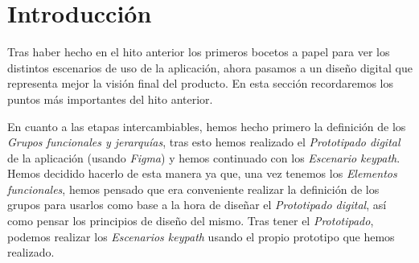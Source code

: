 \section{Introducción}

Tras haber hecho en el hito anterior los primeros bocetos a papel para ver los
distintos escenarios de uso de la aplicación, ahora pasamos a un diseño digital que
representa mejor la visión final del producto. En esta sección recordaremos los puntos
más importantes del hito anterior.

En cuanto a las etapas intercambiables, hemos hecho primero la definición de los \textit{Grupos
funcionales y jerarquías}, tras esto hemos realizado el \textit{Prototipado digital} de la aplicación
(usando \textit{Figma}) y hemos continuado con los \textit{Escenario keypath}. Hemos decidido hacerlo
de esta manera ya que, una vez tenemos los \textit{Elementos funcionales}, hemos pensado que era conveniente
realizar la definición de los grupos para usarlos como base a la hora de diseñar el \textit{Prototipado digital},
así como pensar los principios de diseño del mismo. Tras tener el \textit{Prototipado}, podemos realizar los
\textit{Escenarios keypath} usando el propio prototipo que hemos realizado.